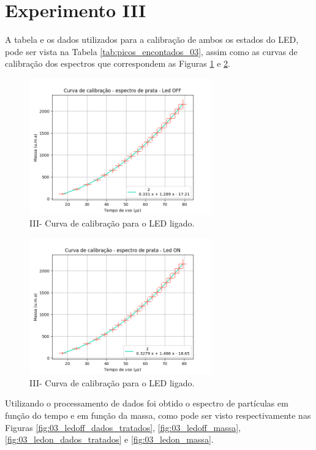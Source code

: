 \section{Experimento III}
A tabela e os dados utilizados para a calibração de ambos os estados do LED, pode ser vista na Tabela \ref{tab:picos_encontados_03}, assim como as curvas de calibração dos espectros que correspondem as Figuras \ref{fig:03_calib_ledOFF} e \ref{fig:03_calib_ledON}.

\begin{figure}
  \centering  
  \includegraphics[width=0.7\textwidth]{exp_03/LEDOFF_curv+erro_calib.png}
  \caption{III- Curva de calibração para o LED ligado.}
  \label{fig:03_calib_ledOFF} 
\end{figure}

\begin{figure}
  \centering  
  \includegraphics[width=0.7\textwidth]{exp_03/LEDON_curv+erro_calib.png}
  \caption{III- Curva de calibração para o LED ligado.}
  \label{fig:03_calib_ledON} 
\end{figure}



Utilizando o processamento de dados foi obtido o espectro de partículas em função do tempo e em função da massa, como pode ser visto respectivamente nas Figuras \ref{fig:03_ledoff_dados_tratados}, \ref{fig:03_ledoff_massa}, \ref{fig:03_ledon_dados_tratados} e \ref{fig:03_ledon_massa}.

